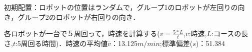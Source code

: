 初期配置：ロボットの位置はランダムで，グループ1のロボットが左回りの向き，グループ2のロボットが右回りの向き．


各ロボットが一台で５周回って，時速を計算する($v=\frac{5*L}{t}$,$v$:時速,$L$:コースの長さ,$t$:5周回る時間)．時速の平均値$\bar v$：13.125$m/min$;標準偏差($s$)：51.384

